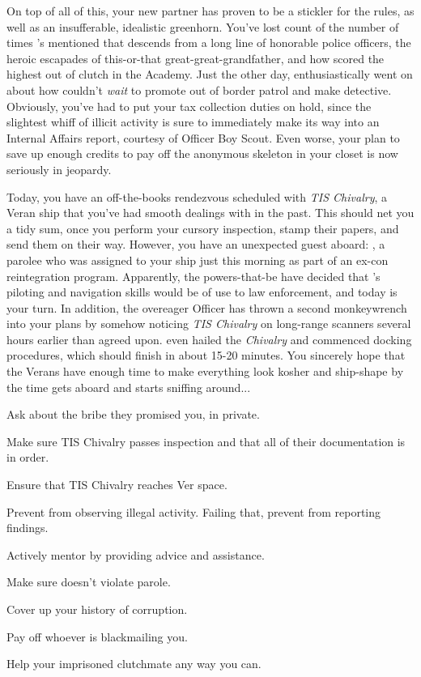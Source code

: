 \documentclass[char]{guildcamp4}
\begin{document}
On top of all of this, your new partner \cCgood{} has proven to be a stickler for the rules, as well as an insufferable, idealistic greenhorn. You've lost count of the number of times 's mentioned that  descends from a long line of honorable police officers, the heroic escapades of this-or-that great-great-grandfather, and how  scored the highest out of  clutch in the Academy. Just the other day,  enthusiastically went on about how  couldn't \textit{wait} to promote out of border patrol and make detective. Obviously, you've had to put your tax collection duties on hold, since the slightest whiff of illicit activity is sure to immediately make its way into an Internal Affairs report, courtesy of Officer Boy Scout. Even worse, your plan to save up enough credits to pay off the anonymous skeleton in your closet is now seriously in jeopardy.

Today, you have an off-the-books rendezvous scheduled with \textit{TIS Chivalry}, a Veran ship that you've had smooth dealings with in the past. This should net you a tidy sum, once you perform your cursory inspection, stamp their papers, and send them on their way. However, you have an unexpected guest aboard: \cPilot{}, a parolee who was assigned to your ship just this morning as part of an ex-con reintegration program. Apparently, the powers-that-be have decided that \cPilot{}'s piloting and navigation skills would be of use to law enforcement, and today is your turn. In addition, the overeager Officer \cCgood{} has thrown a second monkeywrench into your plans by somehow noticing \textit{TIS Chivalry} on long-range scanners several hours earlier than agreed upon.  even hailed the \textit{Chivalry} and commenced docking procedures, which should finish in about 15-20 minutes. You sincerely hope that the Verans have enough time to make everything look kosher and ship-shape by the time \cCgood{} gets aboard and starts sniffing around...

\begin{itemz}[Goals]
	\item Ask \cVone{} about the bribe they promised you, in private.
	\item Make sure TIS Chivalry passes inspection and that all of their documentation is in order.
	\item Ensure that TIS Chivalry reaches Ver space.
	\item Prevent \cCgood{} from observing illegal activity. Failing that, prevent  from reporting  findings.
	\item Actively mentor \cCgood{} by providing advice and assistance.
	\item Make sure \cPilot{} doesn't violate  parole. 
	\item Cover up your history of corruption.
	\item Pay off whoever is blackmailing you.
	\item Help your imprisoned clutchmate any way you can.
\end{itemz}

\begin{itemz}[Notes]
	\item 
\end{itemz}

\begin{contacts}
	\contact{\cCgood{}}
	\contact{\cPilot{}}
	\contact{\cVone{}}
\end{contacts}
\end{document}
